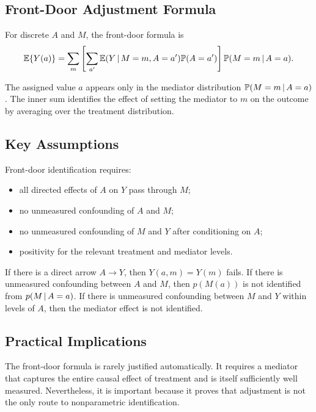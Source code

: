 \subsection{Front-Door Adjustment Formula}

\begin{identificationbox}
For discrete $A$ and $M$, the front-door formula is
\[
  \mathbb{E}\{Y(a)\}
  =
  \sum_m
  \left[
    \sum_{a'} \mathbb{E}(Y\,\vert\, M=m,A=a')\mathbb{P}(A=a')
  \right]
  \mathbb{P}(M=m\,\vert\, A=a).
\]
\end{identificationbox}

The assigned value $a$ appears only in the mediator distribution
$\mathbb{P}(M=m\,\vert\, A=a)$. The inner sum identifies the effect of setting the
mediator to $m$ on the outcome by averaging over the treatment distribution.

\subsection{Key Assumptions}

\begin{assumptionbox}
Front-door identification requires:
\begin{itemize}
  \item all directed effects of $A$ on $Y$ pass through $M$;
  \item no unmeasured confounding of $A$ and $M$;
  \item no unmeasured confounding of $M$ and $Y$ after conditioning on $A$;
  \item positivity for the relevant treatment and mediator levels.
\end{itemize}
\end{assumptionbox}

If there is a direct arrow $A\rightarrow Y$, then $Y(a,m)=Y(m)$ fails. If there
is unmeasured confounding between $A$ and $M$, then $p(M(a))$ is not identified
from $p(M\,\vert\, A=a)$. If there is unmeasured confounding between $M$ and $Y$
within levels of $A$, then the mediator effect is not identified.

\subsection{Practical Implications}

The front-door formula is rarely justified automatically. It requires a mediator
that captures the entire causal effect of treatment and is itself sufficiently
well measured. Nevertheless, it is important because it proves that adjustment
is not the only route to nonparametric identification.


